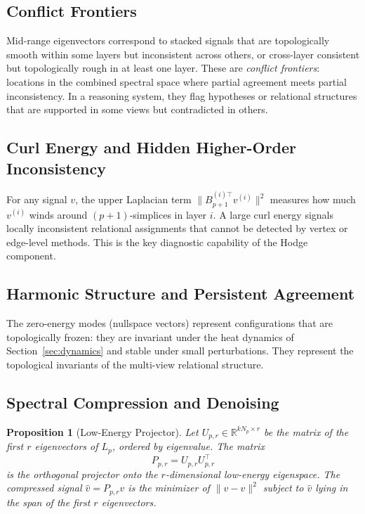 \documentclass[11pt]{article}
\newtheorem{proposition}[theorem]{Proposition}
\theoremstyle{definition}
\theoremstyle{remark}
\newcommand{\R}{\mathbb{R}}
\newcommand{\Pp}{P_{p,r}}
\newcommand{\Up}{U_{p,r}}
\newcommand{\vhat}{\hat{v}}
\begin{document}
\subsection{Conflict Frontiers}

Mid-range eigenvectors correspond to stacked signals that are topologically
smooth within some layers but inconsistent across others, or cross-layer
consistent but topologically rough in at least one layer. These are
\emph{conflict frontiers}: locations in the combined spectral space where
partial agreement meets partial inconsistency. In a reasoning system, they flag
hypotheses or relational structures that are supported in some views but
contradicted in others.

\subsection{Curl Energy and Hidden Higher-Order Inconsistency}

For any signal $v$, the upper Laplacian term $\|B_{p+1}^{(i)\top}v^{(i)}\|^2$
measures how much $v^{(i)}$ winds around $(p+1)$-simplices in layer $i$. A
large curl energy signals locally inconsistent relational assignments that
cannot be detected by vertex or edge-level methods. This is the key diagnostic
capability of the Hodge component.

\subsection{Harmonic Structure and Persistent Agreement}

The zero-energy modes (nullspace vectors) represent configurations that are
topologically frozen: they are invariant under the heat dynamics of
Section~\ref{sec:dynamics} and stable under small perturbations. They represent
the topological invariants of the multi-view relational structure.

\subsection{Spectral Compression and Denoising}

\begin{proposition}[Low-Energy Projector]
\label{prop:compression}
Let $\Up\in\R^{kN_p\times r}$ be the matrix of the first $r$ eigenvectors of
$L_p$, ordered by eigenvalue. The matrix
\[
  \Pp = \Up\Up^\top
\]
is the orthogonal projector onto the $r$-dimensional low-energy eigenspace.
The compressed signal $\vhat = \Pp v$ is the minimizer of
$\|\vhat - v\|^2$ subject to $\vhat$ lying in the span of the first $r$
eigenvectors.
\end{proposition}
\end{document}
